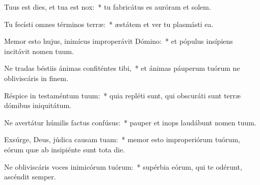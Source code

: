 \item Tuus est dies, et tua est nox:~* tu fabricátus es auróram et solem.

\item Tu fecísti omnes términos terræ:~* æstátem et ver tu plasmásti ea.

\item Memor esto hujus, inimícus improperávit Dómino:~* et pópulus insípiens incitávit nomen tuum.

\item Ne tradas béstiis ánimas confiténtes tibi,~* et ánimas páuperum tuórum ne obliviscáris in finem.

\item Réspice in testaméntum tuum:~* quia repléti sunt, qui obscuráti sunt terræ dómibus iniquitátum.

\item Ne avertátur húmilis factus confúsus:~* pauper et inops laudábunt nomen tuum.

\item Exsúrge, Deus, júdica causam tuam:~* memor esto improperiórum tuórum, eórum quæ ab insipiénte sunt tota die.

\item Ne obliviscáris voces inimicórum tuórum:~* supérbia eórum, qui te odérunt, ascéndit semper.

